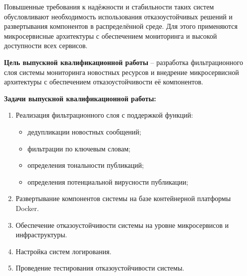 Повышенные требования к надёжности и стабильности таких систем обусловливают необходимость использования
отказоустойчивых решений и развертывания компонентов в распределённой среде. Для этого применяются микросервисные
архитектуры с обеспечением мониторинга и высокой доступности всех сервисов.

\newpage

\textbf{Цель выпускной квалификационной работы} -- разработка фильтрационного слоя системы мониторинга новостных
ресурсов и внедрение микросервисной архитектуры с обеспечением отказоустойчивости её компонентов.

\textbf{Задачи выпускной квалификационной работы:}
\begin{enumerate}
\item Реализация фильтрационного слоя с поддержкой функций:
    \begin{itemize}
    \item дедупликации новостных сообщений;
    \item фильтрации по ключевым словам;
    \item определения тональности публикаций;
    \item определения потенциальной вирусности публикации;
    \end{itemize}
\item Развертывание компонентов системы на базе контейнерной платформы Docker.
\item Обеспечение отказоустойчивости системы на уровне микросервисов и инфраструктуры.
\item Настройка систем логирования.
\item Проведение тестирования отказоустойчивости системы.
\end{enumerate}
